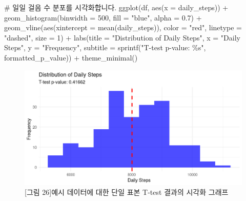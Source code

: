 \documentclass[
  letterpaper,
]{book}
\newenvironment{Shaded}{\begin{snugshade}}{\end{snugshade}}
\newcommand{\AttributeTok}[1]{\textcolor[rgb]{0.40,0.45,0.13}{#1}}
\newcommand{\CommentTok}[1]{\textcolor[rgb]{0.37,0.37,0.37}{#1}}
\newcommand{\DecValTok}[1]{\textcolor[rgb]{0.68,0.00,0.00}{#1}}
\newcommand{\FloatTok}[1]{\textcolor[rgb]{0.68,0.00,0.00}{#1}}
\newcommand{\FunctionTok}[1]{\textcolor[rgb]{0.28,0.35,0.67}{#1}}
\newcommand{\NormalTok}[1]{\textcolor[rgb]{0.00,0.23,0.31}{#1}}
\newcommand{\SpecialCharTok}[1]{\textcolor[rgb]{0.37,0.37,0.37}{#1}}
\newcommand{\StringTok}[1]{\textcolor[rgb]{0.13,0.47,0.30}{#1}}
\renewenvironment{Shaded}
    {\begin{snugshade}
    \begin{singlespace}
    \linespread{1}
    }
    {\end{singlespace}
    \end{snugshade}
}
\begin{document}
\begin{Shaded}
\begin{Highlighting}[]
\CommentTok{\# 일일 걸음 수 분포를 시각화합니다.}
\FunctionTok{ggplot}\NormalTok{(df, }\FunctionTok{aes}\NormalTok{(}\AttributeTok{x =}\NormalTok{ daily\_steps)) }\SpecialCharTok{+}
  \FunctionTok{geom\_histogram}\NormalTok{(}\AttributeTok{binwidth =} \DecValTok{500}\NormalTok{, }\AttributeTok{fill =} \StringTok{"blue"}\NormalTok{, }\AttributeTok{alpha =} \FloatTok{0.7}\NormalTok{) }\SpecialCharTok{+}
  \FunctionTok{geom\_vline}\NormalTok{(}\FunctionTok{aes}\NormalTok{(}\AttributeTok{xintercept =} \FunctionTok{mean}\NormalTok{(daily\_steps)), }\AttributeTok{color =} \StringTok{"red"}\NormalTok{, }\AttributeTok{linetype =} \StringTok{"dashed"}\NormalTok{, }\AttributeTok{size =} \DecValTok{1}\NormalTok{) }\SpecialCharTok{+}
  \FunctionTok{labs}\NormalTok{(}\AttributeTok{title =} \StringTok{"Distribution of Daily Steps"}\NormalTok{,}
       \AttributeTok{x =} \StringTok{"Daily Steps"}\NormalTok{,}
       \AttributeTok{y =} \StringTok{"Frequency"}\NormalTok{,}
       \AttributeTok{subtitle =} \FunctionTok{sprintf}\NormalTok{(}\StringTok{"T{-}test p{-}value: \%s"}\NormalTok{, formatted\_p\_value)) }\SpecialCharTok{+}
  \FunctionTok{theme\_minimal}\NormalTok{()}
\end{Highlighting}
\end{Shaded}

\begin{figure}[H]

{\centering \includegraphics{img/fig26.png}

}

\caption{{[}그림 26{]}예시 데이터에 대한 단일 표본 T-test 결과의 시각화
그래프}

\end{figure}%
\end{document}
